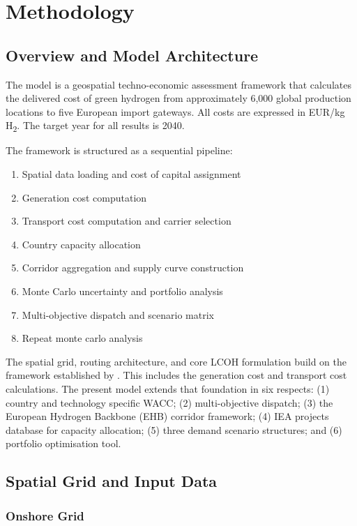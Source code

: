 \chapter{Methodology}
\section{Overview and Model Architecture}

The model is a geospatial techno-economic assessment framework that calculates the delivered cost of green hydrogen from approximately 6{,}000 global production locations to five European import gateways. All costs are expressed in EUR/kg H\textsubscript{2}. The target year for all results is 2040.

The framework is structured as a sequential pipeline:
\begin{enumerate}
    \item Spatial data loading and cost of capital assignment
    \item Generation cost computation
    \item Transport cost computation and carrier selection
    \item Country capacity allocation
    \item Corridor aggregation and supply curve construction
    \item Monte Carlo uncertainty and portfolio analysis
    \item Multi-objective dispatch and scenario matrix
    \item Repeat monte carlo analysis
\end{enumerate}

The spatial grid, routing architecture, and core LCOH formulation build on the framework established by \cite{Collis2022}. This includes the generation cost and transport cost calculations. The present model extends that foundation in six respects: (1) country and technology specific WACC; (2) multi-objective dispatch; (3) the European Hydrogen Backbone (EHB) corridor framework; (4) IEA projects database for capacity allocation; (5) three demand scenario structures; and (6) portfolio optimisation tool.

\section{Spatial Grid and Input Data}

\subsection{Onshore Grid}

